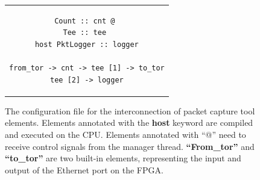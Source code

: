 \begin{figure}[htbp]
\small
\centering
\begin{tabular}{c}
\begin{lstlisting}
Count :: cnt @ 
Tee :: tee 
host PktLogger :: logger

from_tor -> cnt -> tee [1] -> to_tor
tee [2] -> logger
\end{lstlisting}
\end{tabular}
	\caption{The \name configuration file for the interconnection of packet capture tool elements. Elements annotated with the \textbf {host} keyword are compiled and executed on the CPU. Elements annotated with ``@'' need to receive control signals from the manager thread. \textbf {``From\_tor''} and \textbf {``to\_tor''} are two built-in elements, representing the input and output of the Ethernet port on the FPGA.}
	\label{clicknp:fig:logger-config}
\end{figure}

